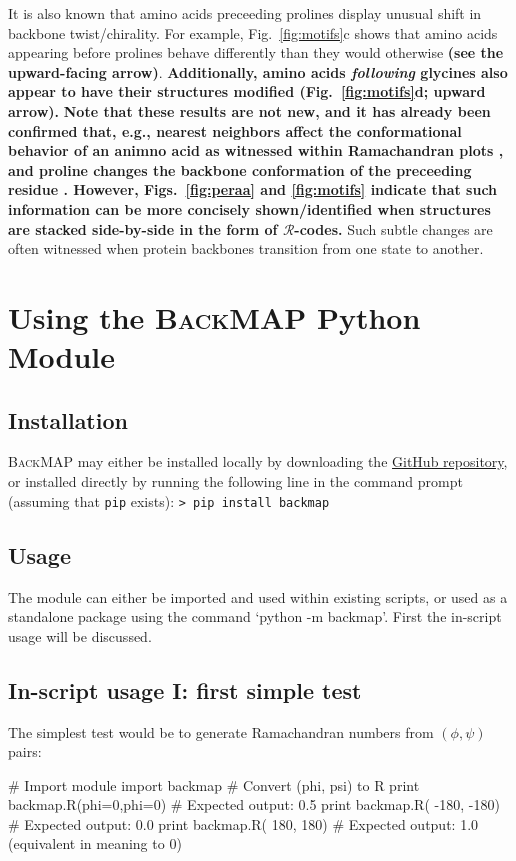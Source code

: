 \documentclass[fleqn,10pt,lineno]{wlpeerj} %
\newcommand{\Fig}[1]{Fig.~\ref{#1}}
\newcommand{\Figs}[1]{Figs.~\ref{#1}}
\newcommand{\n}[1]{{\textbf{\color{red}#1}}}
\newcommand{\gname}{BackMAP}
\newcommand{\pname}{\textsc{\gname}\xspace}
\newcommand{\code}[1]{\texttt{#1}\xspace}
\newcommand{\rr}{$\mathcal{R}$\xspace}
\begin{document}
It is also known that amino acids preceeding prolines display unusual shift in backbone twist/chirality. For example, \Fig{fig:motifs}c shows that amino acids appearing before prolines behave differently than they would otherwise \n{(see the upward-facing arrow)}. \n{Additionally, amino acids {\em following} glycines also appear to have their structures modified (\Fig{fig:motifs}d; upward arrow).} 
\n{Note that these results are not new, and it has already been confirmed that, e.g., nearest neighbors affect the conformational behavior of an animno acid as witnessed within Ramachandran plots \citep{Ting2010}, and proline changes the backbone conformation of the preceeding residue \citep{Gunasekaran1998,Ho2005}. %
However, \Figs{fig:peraa} and \ref{fig:motifs} indicate that such information can be more concisely shown/identified when structures are stacked side-by-side in the form of $\mathcal{R}$-codes.} Such subtle changes are often witnessed when protein backbones transition from one state to another.

\section*{Using the \pname Python Module}

\subsection*{Installation}
\pname may either be installed locally by downloading the \href{https://github.com/ranjanmannige/backmap}{GitHub repository}, or installed directly by running the following line in the command prompt (assuming that \code{pip} exists): \code{> pip install backmap}

\subsection*{Usage}
The module can either be imported and used within existing scripts, or used as a standalone package using the command `python -m backmap'. First the in-script usage will be discussed.

\subsection*{In-script usage I: first simple test}
The simplest test would be to generate Ramachandran numbers from $(\phi,\psi)$ pairs:
\begin{python}
# Import module
import backmap 
# Convert (phi, psi) to R
print backmap.R(phi=0,phi=0) # Expected output: 0.5
print backmap.R( -180, -180) # Expected output: 0.0
print backmap.R(  180,  180) # Expected output: 1.0 (equivalent in meaning to 0)
\end{python}
\end{document}
